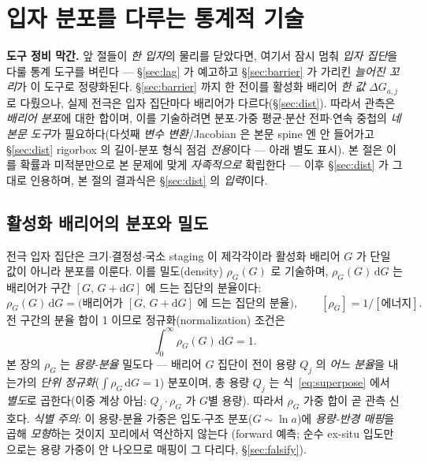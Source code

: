 \documentclass[11pt,a4paper]{article}
\newcommand{\dd}{\mathrm{d}}
\begin{document}
\section{입자 분포를 다루는 통계적 기술}\label{sec:stattools}
\textbf{도구 정비 막간.} 앞 절들이 \emph{한 입자}의 물리를 닫았다면, 여기서 잠시 멈춰 \emph{입자 집단}을 다룰
통계 도구를 벼린다 — \S\ref{sec:lag} 가 예고하고 \S\ref{sec:barrier} 가 가리킨 \emph{늘어진 꼬리}가 이 도구로
정량화된다.
\S\ref{sec:barrier} 까지 한 전이를 활성화 배리어 \emph{한 값} $\Delta G_{a,j}$ 로 다뤘으나, 실제 전극은
입자 집단마다 배리어가 다르다(\S\ref{sec:dist}). 따라서 관측은 \emph{배리어 분포}에 대한 합이며, 이를 기술하려면
분포$\cdot$가중 평균$\cdot$분산 전파$\cdot$연속 중첩의 \emph{네 본문 도구}가 필요하다(다섯째 \emph{변수 변환}/Jacobian 은
본문 spine 엔 안 들어가고 \S\ref{sec:dist} rigorbox 의 길이-분포 형식 점검 \emph{전용}이다 — 아래 별도 표시). 본 절은
이를 확률과 미적분만으로 본 문제에 맞게 \emph{자족적으로} 확립한다 — 이후 \S\ref{sec:dist} 가 그대로 인용하며, 본 절의
결과식은 \S\ref{sec:dist} 의 \emph{입력}이다.

\subsection{활성화 배리어의 분포와 밀도}
전극 입자 집단은 크기$\cdot$결정성$\cdot$국소 staging 이 제각각이라 활성화 배리어 $G$ 가 단일 값이 아니라 분포를
이룬다. 이를 밀도(density) $\rho_G(G)$ 로 기술하며, $\rho_G(G)\,\dd G$ 는 배리어가 구간 $[G,\,G+\dd G]$ 에 드는
집단의 분율이다:
\begin{equation}
\rho_G(G)\,\dd G=\big(\text{배리어가 }[G,\,G+\dd G]\text{ 에 드는 집단의 분율}\big),\qquad [\rho_G]=1/[\text{에너지}].
\label{eq:density}
\end{equation}
전 구간의 분율 합이 1 이므로 정규화(normalization) 조건은
\begin{equation}
\int_0^\infty\rho_G(G)\,\dd G=1.
\label{eq:norm}
\end{equation}
본 장의 $\rho_G$ 는 \emph{용량-분율} 밀도다 — 배리어 $G$ 집단이 전이 용량 $Q_j$ 의 \emph{어느 분율}을 내는가의 \emph{단위
정규화}($\int\rho_G\,\dd G=1$) 분포이며, 총 용량 $Q_j$ 는 식~\eqref{eq:superpose} 에서 \emph{별도}로 곱한다(이중 계상
아님: $Q_j\!\cdot\!\rho_G$ 가 $G$별 용량). 따라서 $\rho_G$ 가중 합이 곧 관측 신호다. \emph{식별 주의}: 이 용량-분율 가중은
입도$\cdot$구조 분포($G\!\sim\!\ln a$)에 \emph{용량-반경 매핑}을 곱해 \emph{모형}하는 것이지 꼬리에서 역산하지 않는다
(forward 예측; 순수 ex-situ 입도만으로는 용량 가중이 안 나오므로 매핑이 그 다리다, \S\ref{sec:falsify}).
\end{document}
